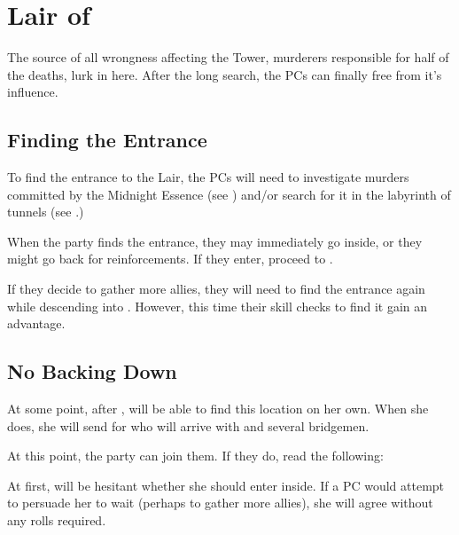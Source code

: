 \section{Lair of \npcMidnightMotherName{}{}}
\label{sec:middnightMother}

The source of all wrongness affecting the Tower, murderers responsible for half of the deaths, lurk in here. After the long search, the PCs can finally free \locationUrithiru{} from it's influence.




\subsection{Finding the Entrance}

To find the entrance to the Lair, the PCs will need to investigate murders committed by the Midnight Essence (see ) and/or search for it in the labyrinth of \locationUrithiru{} tunnels (see .) 

When the party finds the entrance, they may immediately go inside, or they might go back for reinforcements. If they enter, proceed to . 

If they decide to gather more allies, they will need to find the entrance again while descending into . However, this time their skill checks to find it gain an advantage.




\subsection{No Backing Down}
\label{ssec:middnightMotherNoBacking}

At some point, after , \npcShallan{} will be able to find this location on her own. When she does, she will send for \npcAdolin{} who will arrive with \npcRenarin{} and several bridgemen. 

At this point, the party can join them. If they do, read the following:


At first, \npcShallan{} will be hesitant whether she should enter inside. If a PC would attempt to persuade her to wait (perhaps to gather more allies), she will agree without any rolls required. 


